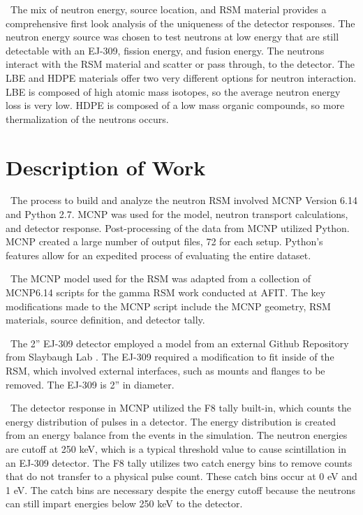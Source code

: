 \documentclass[journal]{IEEEtran}
\begin{document}
    \ The mix of neutron energy, source location, and RSM material provides a comprehensive first look analysis of the uniqueness of the detector responses.  The neutron energy source was chosen to test neutrons at low energy that are still detectable with an EJ-309, fission energy, and fusion energy.  The neutrons interact with the RSM material and scatter or pass through, to the detector.  The LBE and HDPE materials offer two very different options for neutron interaction.  LBE is composed of high atomic mass isotopes, so the average neutron energy loss is very low.  HDPE is composed of a low mass organic compounds, so more thermalization of the neutrons occurs.
	
	\section{Description of Work}
	\ The process to build and analyze the neutron RSM involved MCNP Version 6.14 and Python 2.7. MCNP was used for the model, neutron transport calculations, and detector response. Post-processing of the data from MCNP utilized Python.  MCNP created a large number of output files, 72 for each setup.  Python's features allow for an expedited process of evaluating the entire dataset.   
	
	\ The MCNP model used for the RSM was adapted from a collection of MCNP6.14 scripts for the gamma RSM work conducted at AFIT\cite{RSMcode}. The key modifications made to the MCNP script include the MCNP geometry, RSM materials, source definition, and detector tally. 
	
	\ The 2'' EJ-309 detector employed a model from an external Github Repository from Slaybaugh Lab \cite{88ej309}. The EJ-309 required a modification to fit inside of the RSM, which involved external interfaces, such as mounts and flanges to be removed. The EJ-309 is 2'' in diameter. 
	
	\ The detector response in MCNP utilized the F8 tally built-in, which counts the energy distribution of pulses in a detector\cite{MCNP6}. The energy distribution is created from an energy balance from the events in the simulation. The neutron energies are cutoff at 250 keV, which is a typical threshold value to cause scintillation in an EJ-309 detector.  The F8 tally utilizes two catch energy bins to remove counts that do not transfer to a physical pulse count. These catch bins occur at 0 eV and 1 eV.  The catch bins are necessary despite the energy cutoff because the neutrons can still impart energies below 250 keV to the detector. 
	
\end{document}
